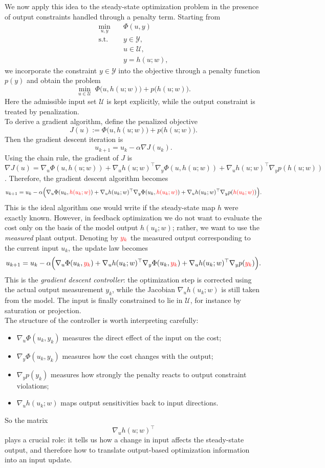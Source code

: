 We now apply this idea to the steady-state optimization problem in the presence of output constraints handled through a penalty term. Starting from
\[
\begin{aligned}
\min_{u,y}\quad & \Phi(u,y)\\
\text{s.t.}\quad & y \in \mathcal Y,\\
& u \in \mathcal U,\\
& y = h(u;w),
\end{aligned}
\]
we incorporate the constraint $y\in\mathcal Y$ into the objective through a penalty function $p(y)$ and obtain the problem
\[
\min_{u\in\mathcal U} \; \Phi\bigl(u,h(u;w)\bigr) + p\bigl(h(u;w)\bigr).
\]
Here the admissible input set $\mathcal U$ is kept explicitly, while the output constraint is treated by penalization.\\
To derive a gradient algorithm, define the penalized objective
\[
J(u):=\Phi\bigl(u,h(u;w)\bigr)+p\bigl(h(u;w)\bigr).
\]
Then the gradient descent iteration is
\[
u_{k+1}=u_k-\alpha \nabla J(u_k).
\]
Using the chain rule, the gradient of $J$ is
\[
\nabla J(u)
=
\nabla_u \Phi(u,h(u;w))
+
\nabla_u h(u;w)^\top \nabla_y \Phi(u,h(u;w))
+
\nabla_u h(u;w)^\top \nabla_y p(h(u;w))
\].
Therefore, the gradient descent algorithm becomes
\[
u_{k+1}
=
u_k
-
\alpha\Bigl(
\nabla_u \Phi(u_k,\textcolor{red}{h(u_k;w)})
+
\nabla_u h(u_k;w)^\top \nabla_y \Phi(u_k,\textcolor{red}{h(u_k;w)})
+
\nabla_u h(u_k;w)^\top \nabla_y p(\textcolor{red}{h(u_k;w)})
\Bigr).
\]
This is the ideal algorithm one would write if the steady-state map $h$ were exactly known. However, in feedback optimization we do not want to evaluate the cost only on the basis of the model output $h(u_k;w)$; rather, we want to use the \emph{measured} plant output. Denoting by $\textcolor{red}{y_k}$ the measured output corresponding to the current input $u_k$, the update law becomes
\[
u_{k+1}
=
u_k
-
\alpha\Bigl(
\nabla_u \Phi(u_k,\textcolor{red}{y_k})
+
\nabla_u h(u_k;w)^\top \nabla_y \Phi(u_k,\textcolor{red}{y_k})
+
\nabla_u h(u_k;w)^\top \nabla_y p(\textcolor{red}{y_k})
\Bigr).
\]
This is the \emph{gradient descent controller}: the optimization step is corrected using the actual output measurement $y_k$, while the Jacobian $\nabla_u h(u_k;w)$ is still taken from the model. The input is finally constrained to lie in $\mathcal U$, for instance by saturation or projection.\\
The structure of the controller is worth interpreting carefully:
\begin{itemize}
    \item $\nabla_u \Phi(u_k,y_k)$ measures the direct effect of the input on the cost;
    \item $\nabla_y \Phi(u_k,y_k)$ measures how the cost changes with the output;
    \item $\nabla_y p(y_k)$ measures how strongly the penalty reacts to output constraint violations;
    \item $\nabla_u h(u_k;w)$ maps output sensitivities back to input directions.
\end{itemize}
So the matrix
\[
\nabla_u h(u;w)^\top
\]
plays a crucial role: it tells us how a change in input affects the steady-state output, and therefore how to translate output-based optimization information into an input update.

